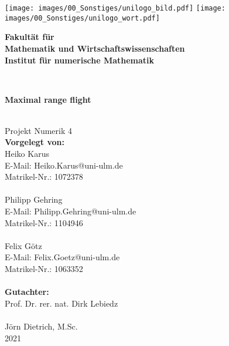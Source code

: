 \documentclass[
a4paper,
11pt,
headsepline,           %
oneside,               %
numbers=noenddot,	   %
bibliography=totoc,    %
]{scrbook}
\makeatletter
\newcommand{\Heiko}{Heiko Karus}
\newcommand{\Philipp}{Philipp Gehring}
\newcommand{\Felix}{Felix Götz}
\newcommand{\Hemail}{Heiko.Karus@uni-ulm.de}
\newcommand{\Pemail}{Philipp.Gehring@uni-ulm.de}
\newcommand{\Femail}{Felix.Goetz@uni-ulm.de}
\newcommand{\Hmatnr}{1072378}
\newcommand{\Pmatnr}{1104946}
\newcommand{\Fmatnr}{1063352}
\newcommand{\titel}{Maximal range flight}
\newcommand{\jahr}{2021}
\newcommand{\gutachterA}{Prof. Dr. rer. nat. Dirk Lebiedz}
\newcommand{\gutachterB}{Jörn Dietrich, M.Sc.}
\newcommand{\fakultaet}{Mathematik und Wirtschaftswissenschaften}
\newcommand{\institut}{Institut für numerische Mathematik}
\makeatother
\begin{document}

\frontmatter

\thispagestyle{empty}
\begin{addmargin*}[4mm]{-10mm}

\texttt{[image: images/00\_Sonstiges/unilogo\_bild.pdf]}
\hfill
\texttt{[image: images/00\_Sonstiges/unilogo\_wort.pdf]}\\[2em]



{\footnotesize
\hspace*{130mm}\parbox[t]{35mm}{
\bfseries Fakultät für\\
\fakultaet\\
\mdseries \institut
}\\[2cm]

\parbox{140mm}{\bfseries \LARGE \titel}\\[2.5em]
{\footnotesize Projekt Numerik 4}\\[2em]

{\footnotesize \bfseries Vorgelegt von:}\\
{\footnotesize \Heiko \\ E-Mail: \Hemail \\ Matrikel-Nr.: \Hmatnr}\\ \\%
{\footnotesize \Philipp \\ E-Mail: \Pemail \\ Matrikel-Nr.: \Pmatnr}\\ \\%
{\footnotesize \Felix \\ E-Mail: \Femail \\ Matrikel-Nr.: \Fmatnr}\\ \\[2em]

{\footnotesize \bfseries Gutachter:}\\                     
{\footnotesize \gutachterA}\\ \\%
{\footnotesize \gutachterB}\\[2em]

{\footnotesize \jahr}
}
\end{addmargin*}
\end{document}
